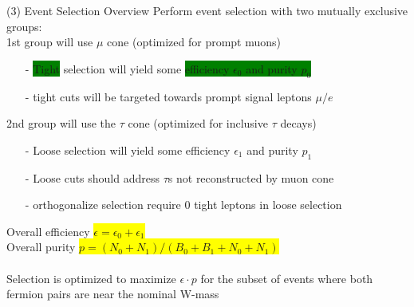 \documentclass[10pt]{beamer}
\begin{document}
\begin{frame}{(3) Event Selection Overview}
Perform event selection with two mutually exclusive groups:\\
1st group will use $\mu$ cone (optimized for prompt muons)
	\begin{itemize}
		\scriptsize
		\item[-]\colorbox{green}{Tight} selection will yield some \colorbox{green}{efficiency $\epsilon_0$ and purity $p_0$}
		\item[-] tight cuts will be targeted towards prompt signal leptons $\mu/e$ 
	\end{itemize} 
2nd group will use the $\tau$ cone (optimized for inclusive $\tau$ decays)
	\begin{itemize}
	\scriptsize
		\item[-] \colorbox{emerald}{Loose} selection will yield some \colorbox{emerald}{efficiency $\epsilon_1$ and purity $p_1$}
		\item[-] Loose cuts should address $\tau$s not reconstructed by muon cone
		\item[-] orthogonalize selection require 0 tight leptons in loose selection
	\end{itemize}
Overall efficiency \colorbox{yellow}{$\epsilon = \epsilon_0 + \epsilon_1$}\\
Overall purity \colorbox{yellow}{$p = (N_0 + N_1) / (B_0 + B_1 + N_0 +N_1)$}\\
\quad \quad \\
Selection is optimized to maximize $\epsilon \cdot p$ for the subset of events where both fermion pairs are near the nominal W-mass

\end{frame}
\end{document}
